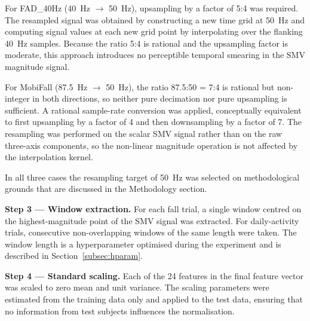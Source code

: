 \documentclass[onluarkali,ingilizce,yukseklisans,karton,LisansustuEgitim]{itutez}
\providecommand{\1}{\mathbf{1}}
\begin{document}
For FAD\_40Hz (40~Hz $\to$ 50~Hz), upsampling by a factor of 5:4 was required. The resampled signal was obtained by constructing a new time grid at 50~Hz and computing signal values at each new grid point by interpolating over the flanking 40~Hz samples. Because the ratio 5:4 is rational and the upsampling factor is moderate, this approach introduces no perceptible temporal smearing in the SMV magnitude signal.

For MobiFall (87.5~Hz $\to$ 50~Hz), the ratio 87.5:50 = 7:4 is rational but non-integer in both directions, so neither pure decimation nor pure upsampling is sufficient. A rational sample-rate conversion was applied, conceptually equivalent to first upsampling by a factor of 4 and then downsampling by a factor of 7. The resampling was performed on the scalar SMV signal rather than on the raw three-axis components, so the non-linear magnitude operation is not affected by the interpolation kernel.

In all three cases the resampling target of 50~Hz was selected on methodological grounds that are discussed in the Methodology section.

\textbf{Step 3 --- Window extraction.}
For each fall trial, a single window centred on the highest-magnitude point of the SMV signal was extracted. For daily-activity trials, consecutive non-overlapping windows of the same length were taken. The window length is a hyperparameter optimised during the experiment and is described in Section~\ref{subsec:hparam}.

\textbf{Step 4 --- Standard scaling.}
Each of the 24 features in the final feature vector was scaled to zero mean and unit variance. The scaling parameters were estimated from the training data only and applied to the test data, ensuring that no information from test subjects influences the normalisation.
\end{document}
